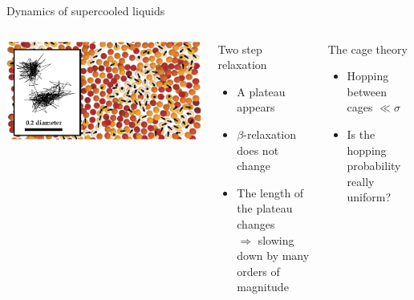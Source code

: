 \begin{frame}{Dynamics of supercooled liquids}
\begin{columns}
	\includegraphics[width=\columnwidth]{cage_weeks}\\
	\begin{block}{Two step relaxation}
	\begin{itemize}
		\item A plateau appears
		\item $\beta$-relaxation does not change
		\item The length of the plateau changes\\ $\Rightarrow$ slowing down by many orders of magnitude
	\end{itemize}
	\end{block}
	\begin{block}{The cage theory}
	\begin{itemize}
		\item Hopping between cages $\ll\sigma$
		\item Is the hopping probability really uniform?
	\end{itemize}
	\end{block}
	\end{columns}
	{\footnotesize\citet{weeks2002pcr}}
\end{frame}

